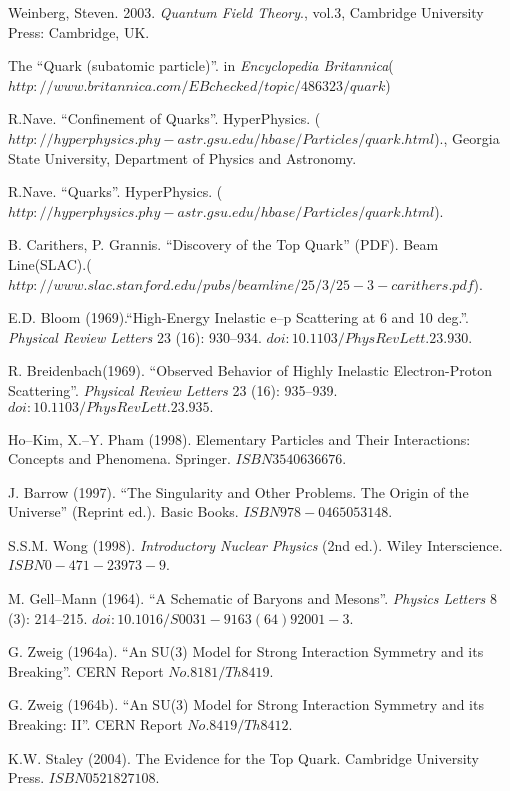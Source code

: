\documentclass[12pt]{article}
\theoremstyle{plain}
\theoremstyle{definition}
\numberwithin{equation}{section}
\begin{document}
\begin{thebibliography}{99}
Weinberg, Steven. 2003. \emph{Quantum Field Theory}., vol.3, Cambridge University Press: Cambridge, UK. 

The ``Quark (subatomic particle)''. in {\em Encyclopedia Britannica}($http://www.britannica.com/EBchecked/topic/486323/quark$)

R.Nave. ``Confinement of Quarks''. HyperPhysics.
($http://hyperphysics.phy-astr.gsu.edu/hbase/Particles/quark.html$)., Georgia State University, Department of Physics and Astronomy.

R.Nave. ``Quarks''. HyperPhysics.
($http://hyperphysics.phy-astr.gsu.edu/hbase/Particles/quark.html$).

B. Carithers, P. Grannis. ``Discovery of the Top Quark'' (PDF). Beam Line(SLAC).($http://www.slac.stanford.edu/pubs/beamline/25/3/25-3-carithers.pdf$).

E.D. Bloom (1969).``High-Energy Inelastic e--p Scattering at 6 and 10 deg.''. {\em Physical Review Letters} 23 (16): 930--934. $doi:10.1103/PhysRevLett.23.930.$

R. Breidenbach(1969). ``Observed Behavior of Highly Inelastic Electron-Proton Scattering''. {\em Physical Review Letters} 23 (16): 935--939.
$doi:10.1103/PhysRevLett.23.935.$

Ho--Kim, X.--Y. Pham (1998). Elementary Particles and Their Interactions: Concepts and Phenomena. Springer. $ISBN 3540636676$.

J. Barrow (1997). ``The Singularity and Other Problems. The Origin of the Universe'' (Reprint ed.). Basic Books. $ISBN 978-0465053148$.

S.S.M. Wong (1998). {\em Introductory Nuclear Physics} (2nd ed.). Wiley Interscience. $ISBN 0-471-23973-9$.

M. Gell--Mann (1964). ``A Schematic of Baryons and Mesons''. {\em Physics Letters} 8 (3): 214--215. $doi:10.1016/S0031-9163(64)92001-3$.

G. Zweig (1964a). ``An SU(3) Model for Strong Interaction Symmetry and its Breaking''. CERN Report $No.8181/Th 8419$.

G. Zweig (1964b). ``An SU(3) Model for Strong Interaction Symmetry and its Breaking: II''. CERN Report $No.8419/Th 8412$.

K.W. Staley (2004). The Evidence for the Top Quark. Cambridge University Press. $ISBN 0521827108$.


\end{thebibliography}
\end{document}
